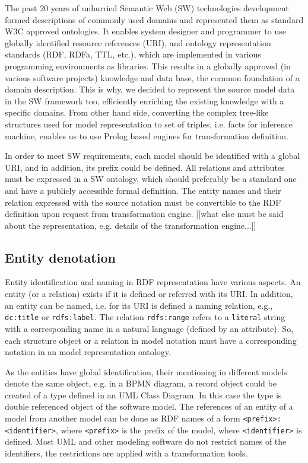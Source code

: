 \documentclass[12pt,a4paper]{llncs}
\begin{document}
The past 20 years of unhurried Semantic Web (SW) technologies development formed descriptions of commonly used domains and represented them as standard W3C approved ontologies.  It enables system designer and programmer to use globally identified resource references (URI), and ontology representation standards (RDF, RDFa, TTL, etc.), which are implemented in various programming environments as libraries.  This results in a globally approved (in various software projects) knowledge and data base, the common foundation of a domain description.  This is why, we decided to represent the source model data in the SW framework too, efficiently enriching the existing knowledge with a specific domains.  From other hand side, converting the complex tree-like structures used for model representation to set of triples, i.e. facts for inference machine, enables us to use Prolog based engines for transformation definition.

In order to meet SW requirements, each model should be identified with a global URI, and in addition, its prefix could be defined.  All relations and attributes must be expressed in a SW ontology, which should preferably be a standard one and have a publicly accessible formal definition.  The entity names and their relation expressed with the source notation must be convertible to the RDF definition upon request from transformation engine.  [[what else must be said about the representation, e.g. details of the transformation engine...]]

\subsection{Entity denotation}
\label{sec:ent-def}

Entity identification and naming in RDF representation have various aspects.  An entity (or a relation) exists if it is defined or referred with its URI.  In addition, an entity can be named,  i.e. for its URI is defined a naming relation, e.g., \texttt{dc:title} or \texttt{rdfs:label}.  The relation \texttt{rdfs:range} refers to a \texttt{literal} string with a corresponding name in a natural language (defined by an attribute).  So, each structure object or a relation in model notation must have a corresponding notation in an model representation ontology.

As the entities have global identification, their mentioning in different models denote the same object, e.g. in a BPMN diagram, a record object could be created of a type defined in an UML Class Diagram.  In this case the type is double referenced object of the software model.  The references of an entity of a model from another model can be done as RDF names of a form \texttt{<prefix>:<identifier>}, where \texttt{<prefix>} is the prefix of the model, where \texttt{<identifier>} is defined.  Most UML and other modeling software do not restrict names of the identifiers, the restrictions are applied with a transformation tools.
\end{document}
